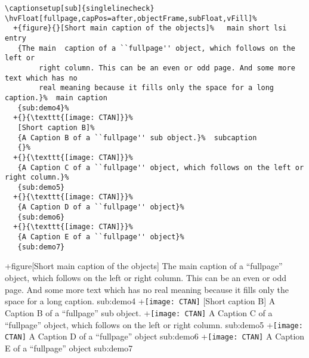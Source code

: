 \documentclass{scrartcl}
\begin{document}
\blinddocument


\begin{lstlisting}
\captionsetup[sub]{singlelinecheck}
\hvFloat[fullpage,capPos=after,objectFrame,subFloat,vFill]%
  +{figure}{}[Short main caption of the objects]%   main short lsi entry
   {The main  caption of a ``fullpage'' object, which follows on the left or
        right column. This can be an even or odd page. And some more text which has no
        real meaning because it fills only the space for a long caption.}%  main caption
   {sub:demo4}%
  +{}{\texttt{[image: CTAN]}}%
   [Short caption B]%
   {A Caption B of a ``fullpage'' sub object.}%  subcaption
   {}%
  +{}{\texttt{[image: CTAN]}}%
   {A Caption C of a ``fullpage'' object, which follows on the left or right column.}%
   {sub:demo5}
  +{}{\texttt{[image: CTAN]}}%
   {A Caption D of a ``fullpage'' object}%
   {sub:demo6}
  +{}{\texttt{[image: CTAN]}}%
   {A Caption E of a ``fullpage'' object}%
   {sub:demo7}
\end{lstlisting}

\Float[subfloat]
\captionsetup[sub]{singlelinecheck}
\hvFloat[fullpage,capPos=after,objectFrame,subFloat,vFill]%
  +{figure}{}[Short main caption of the objects]%
   {The main  caption of a ``fullpage'' object, which follows on the left or
        right column. This can be an even or odd page. And some more text which has no
        real meaning because it fills only the space for a long caption.}%
   {sub:demo4}%
  +{}{\texttt{[image: CTAN]}}%
   [Short caption B]%
   {A Caption B of a ``fullpage'' sub object.}%
   {}%
  +{}{\texttt{[image: CTAN]}}%
   {A Caption C of a ``fullpage'' object, which follows on the left or right column.}%
   {sub:demo5}
  +{}{\texttt{[image: CTAN]}}%
   {A Caption D of a ``fullpage'' object}%
   {sub:demo6}
  +{}{\texttt{[image: CTAN]}}%
   {A Caption E of a ``fullpage'' object}%
   {sub:demo7}



\blinddocument

\Blindtext

\blindtext
\end{document}
